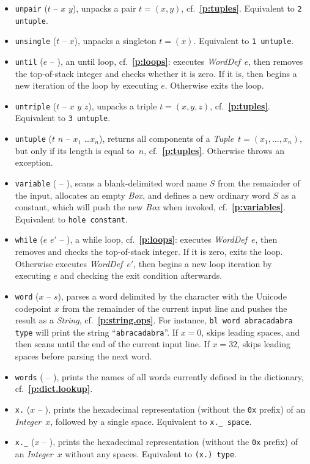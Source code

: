 \documentclass[12pt,oneside]{article}
\def\refpoint#1{{\rm\textbf{\ref{#1}}}}
\let\ptref=\refpoint
\begin{document}
\begin{itemize}
\item {\tt unpair} ($t$ -- $x$ $y$), unpacks a pair $t=(x,y)$, cf.~\ptref{p:tuples}. Equivalent to {\tt 2 untuple}.
\item {\tt unsingle} ($t$ -- $x$), unpacks a singleton $t=(x)$. Equivalent to {\tt 1 untuple}.
\item {\tt until} ($e$ -- ), an until loop, cf.~\ptref{p:loops}: executes {\em WordDef\/}~$e$, then removes the top-of-stack integer and checks whether it is zero. If it is, then begins a new iteration of the loop by executing $e$. Otherwise exits the loop.
\item {\tt untriple} ($t$ -- $x$ $y$ $z$), unpacks a triple $t=(x,y,z)$, cf.~\ptref{p:tuples}. Equivalent to {\tt 3 untuple}.
\item {\tt untuple} ($t$ $n$ -- $x_1$ \dots $x_n$), returns all components of a {\em Tuple\/}~$t=(x_1,\ldots,x_n)$, but only if its length is equal to~$n$, cf.~\ptref{p:tuples}. Otherwise throws an exception.
\item {\tt variable} ( -- ), scans a blank-delimited word name $S$ from the remainder of the input, allocates an empty {\em Box}, and defines a new ordinary word $S$ as a constant, which will push the new {\em Box\/} when invoked, cf.~\ptref{p:variables}. Equivalent to {\tt hole constant}.
\item {\tt while} ($e$ $e'$ -- ), a while loop, cf.~\ptref{p:loops}: executes {\em WordDef\/}~$e$, then removes and checks the top-of-stack integer. If it is zero, exits the loop. Otherwise executes {\em WordDef\/}~$e'$, then begins a new loop iteration by executing $e$ and checking the exit condition afterwards.
\item {\tt word} ($x$ -- $s$), parses a word delimited by the character with the Unicode codepoint $x$ from the remainder of the current input line and pushes the result as a {\em String}, cf.~\ptref{p:string.ops}. For instance, {\tt bl word abracadabra type} will print the string ``{\tt abracadabra}''. If $x=0$, skips leading spaces, and then scans until the end of the current input line. If $x=32$, skips leading spaces before parsing the next word.
\item {\tt words} ( -- ), prints the names of all words currently defined in the dictionary, cf.~\ptref{p:dict.lookup}.
\item {\tt x.} ($x$ -- ), prints the hexadecimal representation (without the {\tt 0x} prefix) of an {\em Integer\/}~$x$, followed by a single space. Equivalent to {\tt x.\_ space}.
\item {\tt x.\_} ($x$ -- ), prints the hexadecimal representation (without the {\tt 0x} prefix) of an {\em Integer\/}~$x$ without any spaces. Equivalent to {\tt (x.)~type}.

\end{itemize}
\end{document}
